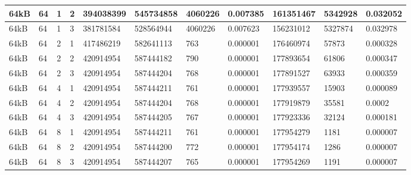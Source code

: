 \documentclass[conference]{IEEEtran}
\begin{document}
\begin{table}
\begin{tabular}{|m{.75cm} |m{.75cm} |m{.8cm} | m{.75cm} | l | l | l | l | l | l | l |}
        64kB&64&1&2&394038399&545734858&4060226&0.007385&161351467&5342928&0.032052\\ \hline
        64kB&64&1&3&381781584&528564944&4060226&0.007623&156231012&5327874&0.032978\\ \hline
        64kB&64&2&1&417486219&582641113&763&0.000001&176460974&57873&0.000328\\ \hline
        64kB&64&2&2&420914954&587444182&790&0.000001&177893654&61806&0.000347\\ \hline
        64kB&64&2&3&420914954&587444204&768&0.000001&177891527&63933&0.000359\\ \hline
        64kB&64&4&1&420914954&587444211&761&0.000001&177939557&15903&0.000089\\ \hline
        64kB&64&4&2&420914954&587444204&768&0.000001&177919879&35581&0.0002\\ \hline
        64kB&64&4&3&420914954&587444205&767&0.000001&177923336&32124&0.000181\\ \hline
        64kB&64&8&1&420914954&587444211&761&0.000001&177954279&1181&0.000007\\ \hline
        64kB&64&8&2&420914954&587444200&772&0.000001&177954174&1286&0.000007\\ \hline
        64kB&64&8&3&420914954&587444207&765&0.000001&177954269&1191&0.000007\\ \hline
        
  \end{tabular}
\end{table}
\end{document}
